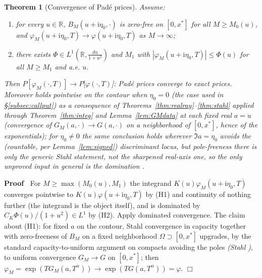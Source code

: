 \documentclass{article}
\newcommand{\tmem}[1]{{\em #1\/}}
\newcommand{\tmtextup}[1]{\text{{\upshape{#1}}}}
\newenvironment{proof}{\noindent\textbf{Proof\ }}{\hspace*{\fill}$\Box$\medskip}
\newtheorem{theorem}{Theorem}
\newcommand{\R}{\mathbb{R}}
\begin{document}
\begin{theorem}
  [Convergence of Pad{\'e} prices]\label{thm:priceconv} Assume:
  \begin{enumerate}
    \item for every $u \in \R$, $B_M  (u + \mathrm{i} \eta_0, \cdot)$ is
    zero-free on $[0, x^{\ast}]$ for all $M \ge M_0 (u)$, and $\varphi_M (u +
    \mathrm{i} \eta_0, T) \to \varphi (u + \mathrm{i} \eta_0, T)$ as $M \to
    \infty$;
    
    \item there exists $\Phi \in L^1 \left( \R, \tfrac{du}{1 + u^2} \right)$
    and $M_1$ with $| \varphi_M (u + \mathrm{i} \eta_0, T) | \le \Phi (u)$ for
    all $M \ge M_1$ and a.e. $u$.
  \end{enumerate}
  Then $P [\varphi_M (\cdot, T)] \to P [\varphi (\cdot, T)$]: Pad{\'e} prices
  converge to exact prices. Moreover \tmtextup{(H1)} holds pointwise on the
  contour when $\eta_0 = 0$ (the case used in
  \S\ref{subsec:callput}) as a consequence of
  Theorems~\ref{thm:realray}--\ref{thm:stahl} applied through
  Theorem~\ref{thm:integ} and Lemma~\ref{lem:GMdata} at each fixed real $a =
  u$ (convergence of $G_M (a, \cdot) \to G (a, \cdot)$ on a neighborhood of
  $[0, x^{\ast}]$, hence of the exponentials); for $\eta_0 \ne 0$ the same
  conclusion holds wherever $\Im  a = \eta_0$ avoids the (countable, per
  Lemma~\ref{lem:signed}) discriminant locus, but pole-freeness there is
  only the generic Stahl statement, not the sharpened real-axis one, so the
  only unproved input in general is the domination \tmtextup{(H2)}.
\end{theorem}

\begin{proof}
  For $M \ge \max (M_0 (u), M_1)$ the integrand $K (u) \varphi_M (u +
  \mathrm{i} \eta_0, T)$ converges pointwise to $K (u) \varphi (u + \mathrm{i}
  \eta_0, T)$ by (H1) and continuity of nothing further (the integrand is the
  object itself), and is dominated by $C_K \Phi (u) / (1 + u^2) \in L^1$ by
  (H2). Apply dominated convergence. The claim about (H1): for fixed $a$ on
  the contour, Stahl convergence in capacity together with zero-freeness of
  $B_M$ on a fixed neighborhood $\Omega \supset [0, x^{\ast}]$ upgrades, by
  the standard capacity-to-uniform argument on compacts avoiding the poles
  {\tmem{(Stahl {\cite[Thm.~1 and {\textsection}6]{Stahl}})}}, to uniform
  convergence $G_M \to G$ on $[0, x^{\ast}]$; then $\varphi_M = \exp (TG_M (a,
  T^{\alpha})) \to \exp (TG (a, T^{\alpha})) = \varphi$.
\end{proof}
\end{document}
